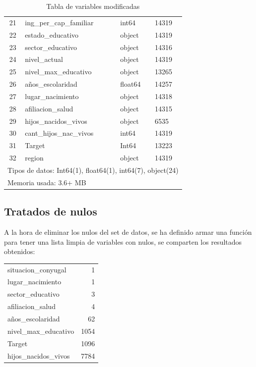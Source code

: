 \documentclass[a4paper]{article}
\begin{document}
\begin{table}[H]
\begin{tabular}{clll}
            21  & ing\_per\_cap\_familiar & int64 & 14319 \\ 
            22  & estado\_educativo & object & 14319 \\ 
            23  & sector\_educativo & object & 14316 \\ 
            24  & nivel\_actual & object & 14319 \\ 
            25  & nivel\_max\_educativo & object & 13265 \\ 
            26  & años\_escolaridad & float64 & 14257 \\ 
            27  & lugar\_nacimiento & object & 14318 \\ 
            28  & afiliacion\_salud & object & 14315 \\ 
            29  & hijos\_nacidos\_vivos & object & 6535 \\ 
            30  & cant\_hijos\_nac\_vivos & int64 & 14319 \\ 
            31  & Target & Int64 & 13223 \\ 
            32  & region & object & 14319 \\
            \bottomrule
            \multicolumn{4}{l}{Tipos de datos: Int64(1), float64(1), int64(7), object(24)} \\
            \multicolumn{4}{l}{Memoria usada: 3.6+ MB } \\
        \end{tabular}
        \caption{Tabla de variables modificadas}
        \label{final table of inputs and Target}
    \end{table}

    \subsection{Tratados de nulos}

        A la hora de eliminar los nulos del set de datos, se ha definido armar una función para tener una lista limpia de variables con nulos, se comparten los resultados obtenidos:

        \begin{table}[H]
            \begin{tabular}{lr}
                situacion\_conyugal & 1 \\ 
                lugar\_nacimiento & 1 \\ 
                sector\_educativo & 3 \\ 
                afiliacion\_salud & 4 \\ 
                años\_escolaridad & 62 \\ 
                nivel\_max\_educativo & 1054 \\ 
                Target & 1096 \\ 
                hijos\_nacidos\_vivos & 7784 \\ 
            \end{tabular}
        \end{table}
\end{document}
